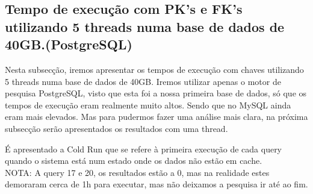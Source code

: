 \documentclass{article}
\begin{document}
  \clearpage



  \subsection{Tempo de execução com PK's e FK's utilizando 5 threads numa base de dados de 40GB.(PostgreSQL)}
\texttt{}\par Nesta subsecção, iremos apresentar os tempos de execução com chaves utilizando 5 threads numa base de dados de 40GB. Iremos utilizar apenas o motor de pesquisa PostgreSQL, visto que esta foi a nossa primeira base de dados, só que os tempos de execução eram realmente muito altos. Sendo que no MySQL ainda eram mais elevados. Mas para pudermos fazer uma análise mais clara, na próxima subsecção serão apresentados os resultados com uma thread.\\
\texttt{}\par É apresentado a Cold Run que se refere à primeira execução de cada query quando o sistema está num estado onde os dados não estão em cache.\\
NOTA: A query 17 e 20, os resultados estão a 0, mas na realidade estes demoraram cerca de 1h para executar, mas não deixamos a pesquisa ir até ao fim.
\end{document}
